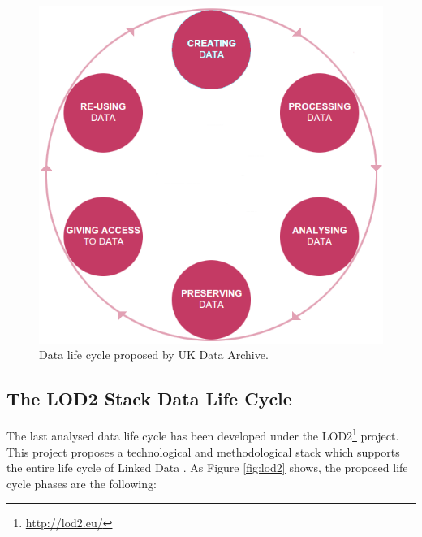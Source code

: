 \begin{figure}
    \center
    \includegraphics[scale=0.3]{img/data_lifecycle/uk-data-archive.png}
    \caption{Data life cycle proposed by UK Data Archive.}
    \label{fig:uk-data-archive}
\end{figure}

\subsection{The LOD2 Stack Data Life Cycle}

The last analysed data life cycle has been developed under the LOD2\footnote{\url{http://lod2.eu/}} project. This project proposes a technological and methodological stack which supports the entire life cycle of Linked Data \cite{auer_managing_2012}. As Figure \ref{fig:lod2} shows, the proposed life cycle phases are the following:

